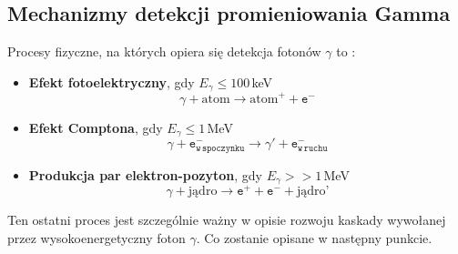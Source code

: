 \documentclass[a4paper,11pt,twoside]{article}
\begin{document}
\subsection{Mechanizmy detekcji promieniowania Gamma}
Procesy fizyczne, na których opiera się detekcja fotonów $\gamma$ to \cite{astro_particle}:
\begin{itemize}
\item {\bf{Efekt fotoelektryczny}}, gdy $E_{\gamma} \leq 100$\,keV
\begin{equation}
\gamma + \text{atom} \rightarrow \text{atom}^+ + \mathtt{e^-}
\end{equation}
\item {\bf{Efekt Comptona}}, gdy $E_{\gamma} \leq 1$\,MeV
\begin{equation}
\gamma + \mathtt{e^{-}_{w\,spoczynku}} \rightarrow \gamma' + \mathtt{e^{-}_{w\,ruchu}}
\end{equation}
\item {\bf{Produkcja par elektron-pozyton}}, gdy $E_{\gamma} >> 1$\,MeV
\begin{equation}
\gamma + \text{jądro} \rightarrow \mathtt{e^+} + \mathtt{e^-} + \text{jądro'}
\end{equation}
\end{itemize}
Ten ostatni proces jest szczególnie ważny w opisie rozwoju kaskady wywołanej przez wysokoenergetyczny foton $\gamma$. Co zostanie opisane w następny punkcie.
\end{document}
